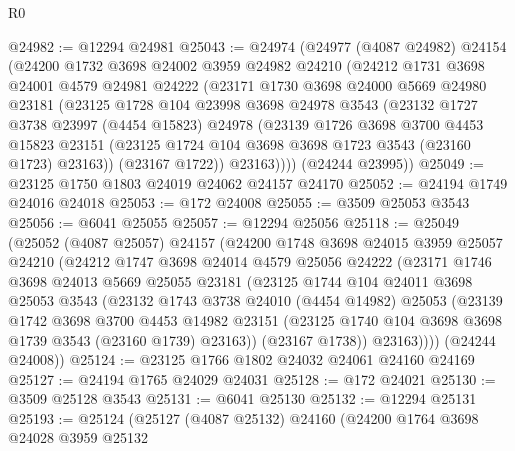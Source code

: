 \begin{lexlean}{R0}
\begin{coremodule}
@24982 := @12294 @24981
@25043 := @24974
    (@24977
      (@4087 @24982)
      @24154
      (@24200
        @1732
        @3698
        @24002
        @3959
        @24982
        @24210
        (@24212
          @1731
          @3698
          @24001
          @4579
          @24981
          @24222
          (@23171
            @1730
            @3698
            @24000
            @5669
            @24980
            @23181
            (@23125
              @1728
              @104
              @23998
              @3698
              @24978
              @3543
              (@23132
                @1727
                @3738
                @23997
                (@4454 @15823)
                @24978
                (@23139
                  @1726
                  @3698
                  @3700
                  @4453
                  @15823
                  @23151
                  (@23125 @1724 @104 @3698 @3698 @1723 @3543 (@23160 @1723) @23163))
                (@23167 @1722))
              @23163))))
      (@24244 @23995))
@25049 := @23125 @1750 @1803 @24019 @24062 @24157 @24170
@25052 := @24194 @1749 @24016 @24018
@25053 := @172 @24008
@25055 := @3509 @25053 @3543
@25056 := @6041 @25055
@25057 := @12294 @25056
@25118 := @25049
    (@25052
      (@4087 @25057)
      @24157
      (@24200
        @1748
        @3698
        @24015
        @3959
        @25057
        @24210
        (@24212
          @1747
          @3698
          @24014
          @4579
          @25056
          @24222
          (@23171
            @1746
            @3698
            @24013
            @5669
            @25055
            @23181
            (@23125
              @1744
              @104
              @24011
              @3698
              @25053
              @3543
              (@23132
                @1743
                @3738
                @24010
                (@4454 @14982)
                @25053
                (@23139
                  @1742
                  @3698
                  @3700
                  @4453
                  @14982
                  @23151
                  (@23125 @1740 @104 @3698 @3698 @1739 @3543 (@23160 @1739) @23163))
                (@23167 @1738))
              @23163))))
      (@24244 @24008))
@25124 := @23125 @1766 @1802 @24032 @24061 @24160 @24169
@25127 := @24194 @1765 @24029 @24031
@25128 := @172 @24021
@25130 := @3509 @25128 @3543
@25131 := @6041 @25130
@25132 := @12294 @25131
@25193 := @25124
    (@25127
      (@4087 @25132)
      @24160
      (@24200
        @1764
        @3698
        @24028
        @3959
        @25132

\end{coremodule}
\end{lexlean}
